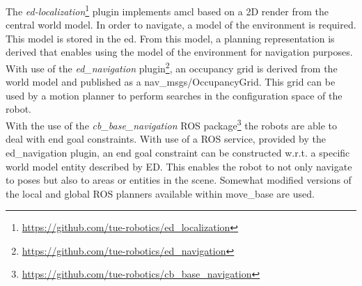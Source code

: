 The \emph{ed-localization}\footnote{\url{https://github.com/tue-robotics/ed_localization}} plugin implements \acrshort{amcl} based on a 2D render from the central world model. In order to navigate, a model of the environment is required. This model is stored in the \acrshort{ed}. From this model, a planning representation is derived that enables using the model of the environment for navigation purposes.
\\
With use of the \emph{ed\_navigation} plugin\footnote{\url{https://github.com/tue-robotics/ed_navigation}}, an occupancy grid is derived from the world model and published as a nav\_msgs/OccupancyGrid. This grid can be used by a motion planner to perform searches in the configuration space of the robot.
\\
With the use of the \emph{cb\_base\_navigation} ROS package\footnote{\url{https://github.com/tue-robotics/cb_base_navigation}} the robots are able to deal with end goal constraints. With use of a ROS service, provided by the ed\_navigation plugin, an end goal constraint can be constructed w.r.t. a specific world model entity described by ED. This enables the robot to not only navigate to poses but also to areas or entities in the scene.
Somewhat modified versions of the local and global ROS planners available within move\_base are used.
